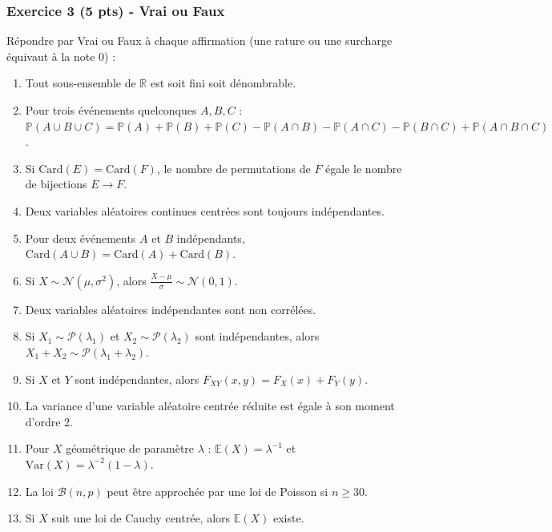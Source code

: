 \documentclass[12pt,a4paper]{article}
\begin{document}
\subsubsection*{Exercice 3 (5 pts) - Vrai ou Faux \niveau{\facile}}

\begin{boiteexercice}
Répondre par Vrai ou Faux à chaque affirmation (une rature ou une surcharge équivaut à la note 0) :
\begin{enumerate}
  \item Tout sous-ensemble de $\mathbb{R}$ est soit fini soit dénombrable.
  \item Pour trois événements quelconques $A,B,C$ : $\mathbb{P}(A\cup B\cup C)=\mathbb{P}(A)+\mathbb{P}(B)+\mathbb{P}(C)-\mathbb{P}(A\cap B)-\mathbb{P}(A\cap C)-\mathbb{P}(B\cap C)+\mathbb{P}(A\cap B\cap C)$.
  \item Si $\mathrm{Card}(E)=\mathrm{Card}(F)$, le nombre de permutations de $F$ égale le nombre de bijections $E\to F$.
  \item Deux variables aléatoires continues centrées sont toujours indépendantes.
  \item Pour deux événements $A$ et $B$ indépendants, $\mathrm{Card}(A\cup B)=\mathrm{Card}(A)+\mathrm{Card}(B)$.
  \item Si $X\sim\mathcal{N}(\mu,\sigma^2)$, alors $\frac{X-\mu}{\sigma}\sim\mathcal{N}(0,1)$.
  \item Deux variables aléatoires indépendantes sont non corrélées.
  \item Si $X_1\sim\mathcal{P}(\lambda_1)$ et $X_2\sim\mathcal{P}(\lambda_2)$ sont indépendantes, alors $X_1+X_2\sim\mathcal{P}(\lambda_1+\lambda_2)$.
  \item Si $X$ et $Y$ sont indépendantes, alors $F_{XY}(x,y)=F_X(x)+F_Y(y)$.
  \item La variance d'une variable aléatoire centrée réduite est égale à son moment d'ordre 2.
  \item Pour $X$ géométrique de paramètre $\lambda$ : $\mathbb{E}(X)=\lambda^{-1}$ et $\mathrm{Var}(X)=\lambda^{-2}(1-\lambda)$.
  \item La loi $\mathcal{B}(n,p)$ peut être approchée par une loi de Poisson si $n\geq 30$.
  \item Si $X$ suit une loi de Cauchy centrée, alors $\mathbb{E}(X)$ existe.
\end{enumerate}
\end{boiteexercice}
\end{document}
